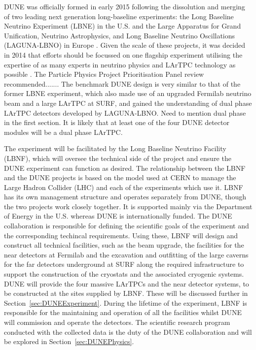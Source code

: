 DUNE was officially formed in early 2015 following the dissolution and merging of two leading next generation long-baseline experiments: the Long Baseline Neutrino Experiment (LBNE) in the U.S. \cite{LBNECDR1,LBNECDR3,LBNECDR4a} and the Large Apparatus for Grand Unification, Neutrino Astrophysics, and Long Baseline Neutrino Oscillations (LAGUNA-LBNO) in Europe \cite{LAGUNA-LBNO2015}.  Given the scale of these projects, it was decided in 2014 that efforts should be focussed on one flagship experiment utilising the expertise of as many experts in neutrino physics and LArTPC technology as possible \cite{P52014}.  The Particle Physics Project Prioritisation Panel review recommended.......  The benchmark DUNE design is very similar to that of the former LBNE experiment, which also made use of an upgraded Fermilab neutrino beam and a large LArTPC at SURF, and gained the understanding of dual phase LArTPC detectors developed by LAGUNA-LBNO. {\color{red} Need to mention dual phase in the first section.}  It is likely that at least one of the four DUNE detector modules will be a dual phase LArTPC.

The experiment will be facilitated by the Long Baseline Neutrino Facility (LBNF), which will oversee the technical side of the project and ensure the DUNE experiment can function as desired.  The relationship between the LBNF and the DUNE projects is based on the model used at CERN to manage the Large Hadron Collider (LHC) and each of the experiments which use it.  LBNF has its own management structure and operates separately from DUNE, though the two projects work closely together.  It is supported mainly via the Department of Energy in the U.S. whereas DUNE is internationally funded.  The DUNE collaboration is responsible for defining the scientific goals of the experiment and the corresponding techincal requirements.  Using these, LBNF will design and construct all technical facilities, such as the beam upgrade, the facilities for the near detectors at Fermilab and the excavation and outfitting of the large caverns for the far detectors underground at SURF along the required infrastructure to support the construction of the cryostats and the associated cryogenic systems.  DUNE will provide the four massive LArTPCs and the near detector systems, to be constructed at the sites supplied by LBNF.  These will be discussed further in Section~\ref{sec:DUNEExperiment}.  During the lifetime of the experiment, LBNF is responsible for the maintaining and operation of all the facilities whilst DUNE will commission and operate the detectors.  The scientific research program conducted with the collected data is the duty of the DUNE collaboration and will be explored in Section~\ref{sec:DUNEPhysics}.

